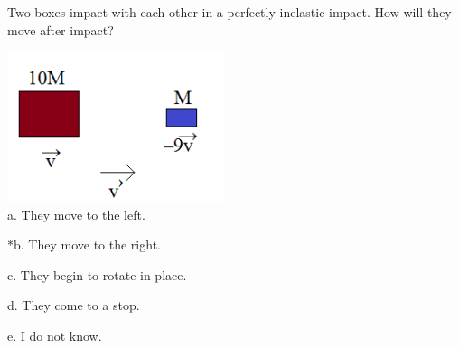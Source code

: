 
Two boxes impact with each other in a perfectly inelastic impact. How will they move after impact?

\includegraphics[width=2.5in]{../../Images/ImpulseAndMomentumQ6.png}\\

a. They move to the left.

*b. They move to the right.

c. They begin to rotate in place.

d. They come to a stop.

e. I do not know.\\
